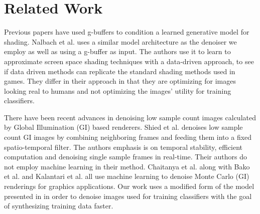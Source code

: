 \documentclass[10pt,twocolumn,letterpaper]{article}
\newcommand{\tompson}[1]{{\color{green} JT: #1}}
\begin{document}
\section{Related Work}

Previous papers have used g-buffers to condition a learned generative model for shading. Nalbach et al. \cite{DBLP:journals/corr/NalbachAMSR16} uses a similar model architecture as the denoiser we employ as well as using a g-buffer as input.  The authors use it to learn to approximate screen space shading techniques with a data-driven approach, to see if data driven methods can replicate the standard shading methods used in games. They differ in their approach in that they are optimizing for images looking real to humans and not optimizing the images' utility for training classifiers.


There have been recent advances in denoising low sample count images calculated by Global Illumination (GI) based renderers.
Shied et al. \cite{Schied:2017:SVF:3105762.3105770} denoises low sample count GI images by combining neighboring frames and feeding them into a fixed spatio-temporal filter.  The authors emphasis is on temporal stability, efficient computation and denoising single sample frames in real-time. Their authors do not employ machine learning in their method. 
Chaitanya et al. \cite{Chaitanya:2017:IRM:3072959.3073601} along with 
Bako et al. \cite{Bako17} and 
Kalantari et al. \cite{Kalantari:2015:MLA:2809654.2766977} all use machine learning to denoise Monte Carlo (GI) renderings for graphics applications.  Our work uses a modified form of the model presented in \cite{Chaitanya:2017:IRM:3072959.3073601} in order to denoise images used for training classifiers with the goal of synthesizing training data faster. 
\end{document}
